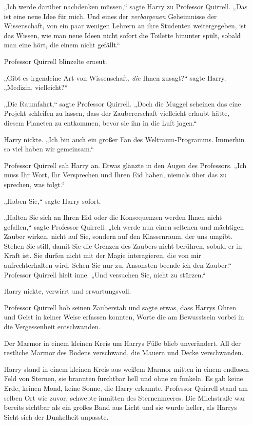 {„Ich werde darüber nachdenken müssen,“ sagte Harry zu Professor Quirrell. „Das ist eine neue Idee für mich. Und eines der \emph{verborgenen} Geheimnisse der Wissenschaft, von ein paar wenigen Lehrern an ihre Studenten weitergegeben, ist das Wissen, wie man neue Ideen nicht sofort die Toilette hinunter spült, sobald man eine hört, die einem nicht gefällt.“

Professor Quirrell blinzelte erneut.

„Gibt es irgendeine Art von Wissenschaft, \emph{die} Ihnen zusagt?“ sagte Harry. „Medizin, vielleicht?“

„Die Raumfahrt,“ sagte Professor Quirrell. „Doch die Muggel scheinen das eine Projekt schleifen zu lassen, dass der Zaubererschaft vielleicht erlaubt hätte, diesem Planeten zu entkommen, bevor sie ihn in die Luft jagen.“

Harry nickte. „Ich bin auch ein großer Fan des Weltraum-Programms. Immerhin so viel haben wir gemeinsam.“

Professor Quirrell sah Harry an. Etwas glänzte in den Augen des Professors. „Ich muss Ihr Wort, Ihr Versprechen und Ihren Eid haben, niemals über das zu sprechen, was folgt.“

„Haben Sie,“ sagte Harry sofort.

„Halten Sie sich an Ihren Eid oder die Konsequenzen werden Ihnen nicht gefallen,“ sagte Professor Quirrell. „Ich werde nun einen seltenen und mächtigen Zauber wirken, nicht auf Sie, sondern auf den Klassenraum, der uns umgibt. Stehen Sie still, damit Sie die Grenzen des Zaubers nicht berühren, sobald er in Kraft ist. Sie dürfen nicht mit der Magie interagieren, die von mir aufrechterhalten wird. Sehen Sie nur zu. Ansonsten beende ich den Zauber.“ Professor Quirrell hielt inne. „Und versuchen Sie, nicht zu stürzen.“

Harry nickte, verwirrt und erwartungsvoll.

Professor Quirrell hob seinen Zauberstab und sagte etwas, dass Harrys Ohren und Geist in keiner Weise erfassen konnten, Worte die am Bewusstsein vorbei in die Vergessenheit entschwanden.

Der Marmor in einem kleinen Kreis um Harrys Füße blieb unverändert. All der restliche Marmor des Bodens verschwand, die Mauern und Decke verschwanden.

Harry stand in einem kleinen Kreis aus weißem Marmor mitten in einem endlosen Feld von Sternen, sie brannten furchtbar hell und ohne zu funkeln. Es gab keine Erde, keinen Mond, keine Sonne, die Harry erkannte. Professor Quirrell stand am selben Ort wie zuvor, schwebte inmitten des Sternenmeeres. Die Milchstraße war bereits sichtbar als ein großes Band aus Licht und sie wurde heller, als Harrys Sicht sich der Dunkelheit anpasste.

}
